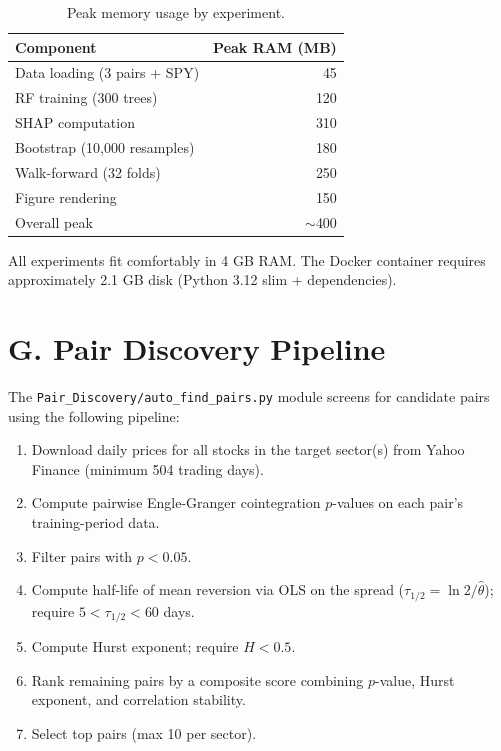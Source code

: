 \documentclass[conference]{IEEEtran}
\begin{document}
\begin{table}[h]
\centering
\caption{Peak memory usage by experiment.}
\label{tab:supp_memory}
\small
\begin{tabular}{lr}
\toprule
Component & Peak RAM (MB) \\
\midrule
Data loading (3 pairs + SPY) & 45 \\
RF training (300 trees) & 120 \\
SHAP computation & 310 \\
Bootstrap (10,000 resamples) & 180 \\
Walk-forward (32 folds) & 250 \\
Figure rendering & 150 \\
\midrule
Overall peak & $\sim$400 \\
\bottomrule
\end{tabular}
\end{table}

All experiments fit comfortably in 4 GB RAM. The Docker container
requires approximately 2.1 GB disk (Python 3.12 slim + dependencies).

\section{G. Pair Discovery Pipeline}
\label{sec:pairs}

The \texttt{Pair\_Discovery/auto\_find\_pairs.py} module screens for
candidate pairs using the following pipeline:

\begin{enumerate}
    \item Download daily prices for all stocks in the target sector(s)
    from Yahoo Finance (minimum 504 trading days).
    \item Compute pairwise Engle-Granger cointegration $p$-values on each
    pair's training-period data.
    \item Filter pairs with $p < 0.05$.
    \item Compute half-life of mean reversion via OLS on the spread
    ($\tau_{1/2} = \ln 2 / \hat{\theta}$); require $5 < \tau_{1/2} < 60$ days.
    \item Compute Hurst exponent; require $H < 0.5$.
    \item Rank remaining pairs by a composite score combining $p$-value,
    Hurst exponent, and correlation stability.
    \item Select top pairs (max 10 per sector).
\end{enumerate}
\end{document}
